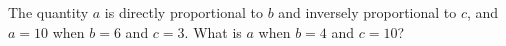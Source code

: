 The quantity $a$ is directly proportional to $b$ and inversely proportional to $c$, and $a=10$ when $b=6$ and $c=3$. What is $a$ when $b=4$ and $c=10$?
